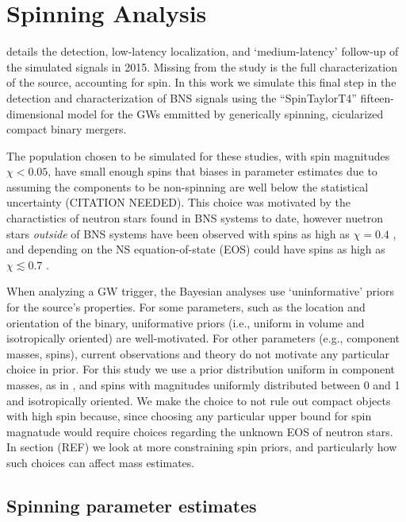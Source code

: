 \section{Spinning Analysis}

\citet{2013arXiv1304.0670L} details the detection, low-latency localization, and `medium-latency' follow-up of the simulated signals in 2015.  Missing from the study is the full characterization of the source, accounting for spin.  In this work we simulate this final step in the detection and characterization of BNS signals using the ``SpinTaylorT4'' fifteen-dimensional model for the GWs emmitted by generically spinning, cicularized compact binary mergers. 

The population chosen to be simulated for these studies, with spin magnitudes $\chi < 0.05$, have small enough spins that biases in parameter estimates due to assuming the components to be non-spinning are well below the statistical uncertainty (CITATION NEEDED).  This choice was motivated by the charactistics of neutron stars found in BNS systems to date, however nuetron stars \emph{outside} of BNS systems have been observed with spins as high as $\chi = 0.4$ \cite{Hessels_2006,Brown_2012}, and depending on the NS equation-of-state (EOS) could have spins as high as $\chi \lesssim 0.7$ \cite{Lo_2011}.

When analyzing a GW trigger, the Bayesian analyses use `uninformative' priors for the source's properties.  For some parameters, such as the location and orientation of the binary, uniformative priors (i.e., uniform in volume and isotropically oriented) are well-motivated.  For other parameters (e.g., component masses, spins), current observations and theory do not motivate any particular choice in prior.  For this study we use a prior distribution uniform in component masses, as in \citet{2013arXiv1304.0670L}, and spins with magnitudes uniformly distributed between 0 and 1 and isotropically oriented.  We make the choice to not rule out compact objects with high spin because, since choosing any particular upper bound for spin magnatude would require choices regarding the unknown EOS of neutron stars.  In section (REF) we look at more constraining spin priors, and particularly how such choices can affect mass estimates.

\subsection{Spinning parameter estimates}


